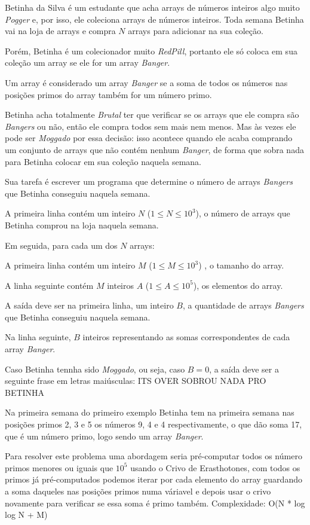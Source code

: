 Betinha da Silva é um estudante que acha arrays de números inteiros algo muito \textit{Pogger} e, por isso, ele coleciona arrays de números inteiros.  
Toda semana Betinha vai na loja de arrays e compra $N$ arrays para adicionar na sua coleção.  

Porém, Betinha é um colecionador muito \textit{RedPill}, portanto ele só coloca em sua coleção um array se ele for um array \textit{Banger}.  

Um array é considerado um array \textit{Banger} se a soma de todos os números nas posições primos do array também for um número primo.  

Betinha acha totalmente \textit{Brutal} ter que verificar se os arrays que ele compra são \textit{Bangers} ou não, então ele compra todos sem mais nem menos.  
Mas às vezes ele pode ser \textit{Moggado} por essa decisão: isso acontece quando ele acaba comprando um conjunto de arrays que não contém nenhum \textit{Banger}, de forma que sobra nada para Betinha colocar em sua coleção naquela semana.  

Sua tarefa é escrever um programa que determine o número de arrays \textit{Bangers} que Betinha conseguiu naquela semana.

A primeira linha contém um inteiro $N$ ($1 \leq N \leq 10^3$), o número de arrays que Betinha comprou na loja naquela semana.  

Em seguida, para cada um dos $N$ arrays:  

A primeira linha contém um inteiro $M$ ($1 \leq M \leq 10^3$) , o tamanho do array.  

A linha seguinte contém $M$ inteiros $A$ ($1 \leq A \leq 10^5$), os elementos do array.  

A saída deve ser na primeira linha, um inteiro $B$, a quantidade de arrays \textit{Bangers} que Betinha conseguiu naquela semana.  

Na linha seguinte, $B$ inteiros representando as somas correspondentes de cada array \textit{Banger}.  

Caso Betinha tennha sido \textit{Moggado}, ou seja, caso $B = 0$, a saída deve ser a seguinte frase em letras maiúsculas: ITS OVER SOBROU NADA PRO BETINHA

Na primeira semana do primeiro exemplo Betinha tem na primeira semana nas posições primos 2, 3 e 5 os números 9, 4 e 4 respectivamente, o que dão soma 17, que é um número primo, logo sendo um array \textit{Banger}.

Para resolver este problema uma abordagem seria pré-computar todos os número primos menores ou iguais que $10^5$ usando o Crivo de Erasthotones, com todos os primos já pré-computados podemos iterar por cada elemento do array guardando a soma daqueles nas posições primos numa váriavel e depois usar o crivo novamente para verificar se essa soma é primo também.
Complexidade: O(N * log log N + M) 
